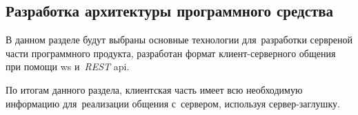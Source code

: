 \subsection{Разработка архитектуры программного средства}
\label{sec:development:arch:pp}

В данном разделе будут выбраны основные технологии для~разработки сервреной части программного продукта, разработан формат клиент-серверного общения при помощи \gls{ws} и~\textit{REST} \gls{api}.






По итогам данного раздела, клиентская часть имеет всю необходимую информацию для~реализации общения с~сервером, используя сервер-заглушку.